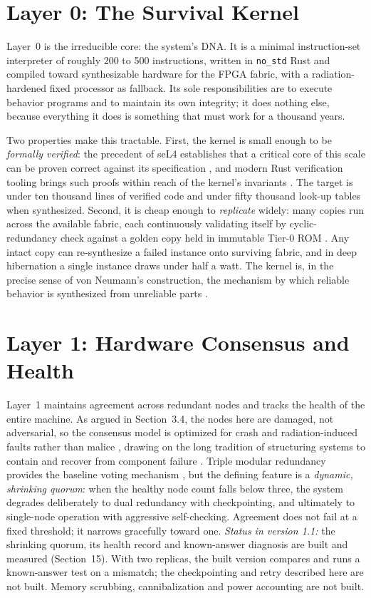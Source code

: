\documentclass[10pt, a4paper]{article}
\begin{document}
\section{Layer 0: The Survival Kernel}

Layer~0 is the irreducible core: the system's DNA. It is a minimal instruction-set interpreter of roughly 200 to 500 instructions, written in \texttt{no\_std} Rust and compiled toward synthesizable hardware for the FPGA fabric, with a radiation-hardened fixed processor as fallback. Its sole responsibilities are to execute behavior programs and to maintain its own integrity; it does nothing else, because everything it does is something that must work for a thousand years.

Two properties make this tractable. First, the kernel is small enough to be \textit{formally verified}: the precedent of seL4 establishes that a critical core of this scale can be proven correct against its specification \cite{klein2009}, and modern Rust verification tooling brings such proofs within reach of the kernel's invariants \cite{astrauskas2019, kani2024}. The target is under ten thousand lines of verified code and under fifty thousand look-up tables when synthesized. Second, it is cheap enough to \textit{replicate} widely: many copies run across the available fabric, each continuously validating itself by cyclic-redundancy check against a golden copy held in immutable Tier-0 ROM \cite{hamming1950}. Any intact copy can re-synthesize a failed instance onto surviving fabric, and in deep hibernation a single instance draws under half a watt. The kernel is, in the precise sense of von Neumann's construction, the mechanism by which reliable behavior is synthesized from unreliable parts \cite{vonneumann1956}.

\section{Layer 1: Hardware Consensus and Health}

Layer~1 maintains agreement across redundant nodes and tracks the health of the entire machine. As argued in Section~3.4, the nodes here are damaged, not adversarial, so the consensus model is optimized for crash and radiation-induced faults rather than malice \cite{avizienis2004}, drawing on the long tradition of structuring systems to contain and recover from component failure \cite{randell1975}. Triple modular redundancy provides the baseline voting mechanism \cite{lyons1962}, but the defining feature is a \textit{dynamic, shrinking quorum}: when the healthy node count falls below three, the system degrades deliberately to dual redundancy with checkpointing, and ultimately to single-node operation with aggressive self-checking. Agreement does not fail at a fixed threshold; it narrows gracefully toward one. \textit{Status in version 1.1:} the shrinking quorum, its health record and known-answer diagnosis are built and measured (Section~15). With two replicas, the built version compares and runs a known-answer test on a mismatch; the checkpointing and retry described here are not built. Memory scrubbing, cannibalization and power accounting are not built.
\end{document}
